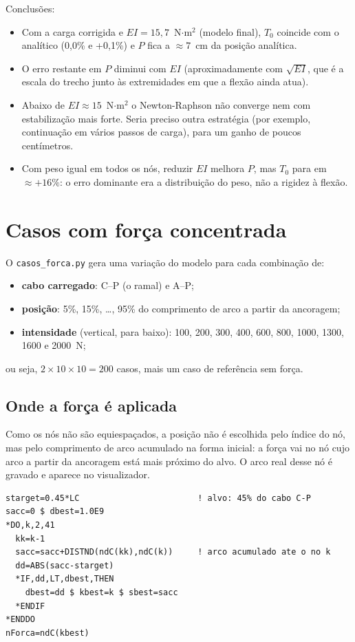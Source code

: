 \documentclass[11pt,a4paper]{article}
\begin{document}
Conclusões:
\begin{itemize}[itemsep=2pt]
  \item Com a carga corrigida e $EI=15{,}7$~N$\cdot$m$^2$ (modelo final), $T_0$ coincide com o
        analítico (0,0\% e +0,1\%) e $P$ fica a $\approx 7$~cm da posição analítica.
  \item O erro restante em $P$ diminui com $EI$ (aproximadamente com $\sqrt{EI}$, que é a escala do
        trecho junto às extremidades em que a flexão ainda atua).
  \item Abaixo de $EI\approx 15$~N$\cdot$m$^2$ o Newton-Raphson não converge nem com estabilização
        mais forte. Seria preciso outra estratégia (por exemplo, continuação em vários passos de
        carga), para um ganho de poucos centímetros.
  \item Com peso igual em todos os nós, reduzir $EI$ melhora $P$, mas $T_0$ para em $\approx +16\%$:
        o erro dominante era a distribuição do peso, não a rigidez à flexão.
\end{itemize}

\section{Casos com força concentrada}\label{sec:casos}

O \texttt{casos\_forca.py} gera uma variação do modelo para cada combinação de:
\begin{itemize}[itemsep=2pt]
  \item \textbf{cabo carregado}: C--P (o ramal) e A--P;
  \item \textbf{posição}: 5\%, 15\%, \dots, 95\% do comprimento de arco a partir da ancoragem;
  \item \textbf{intensidade} (vertical, para baixo): 100, 200, 300, 400, 600, 800, 1000, 1300, 1600 e 2000~N;
\end{itemize}
ou seja, $2\times10\times10 = 200$ casos, mais um caso de referência sem força.

\subsection{Onde a força é aplicada}
Como os nós não são equiespaçados, a posição não é escolhida pelo índice do nó, mas pelo
comprimento de arco acumulado na forma inicial: a força vai no nó cujo arco a partir da ancoragem
está mais próximo do alvo. O arco real desse nó é gravado e aparece no visualizador.
\begin{lstlisting}[language=APDL]
starget=0.45*LC                        ! alvo: 45% do cabo C-P
sacc=0 $ dbest=1.0E9
*DO,k,2,41
  kk=k-1
  sacc=sacc+DISTND(ndC(kk),ndC(k))     ! arco acumulado ate o no k
  dd=ABS(sacc-starget)
  *IF,dd,LT,dbest,THEN
    dbest=dd $ kbest=k $ sbest=sacc
  *ENDIF
*ENDDO
nForca=ndC(kbest)
\end{lstlisting}
\end{document}
